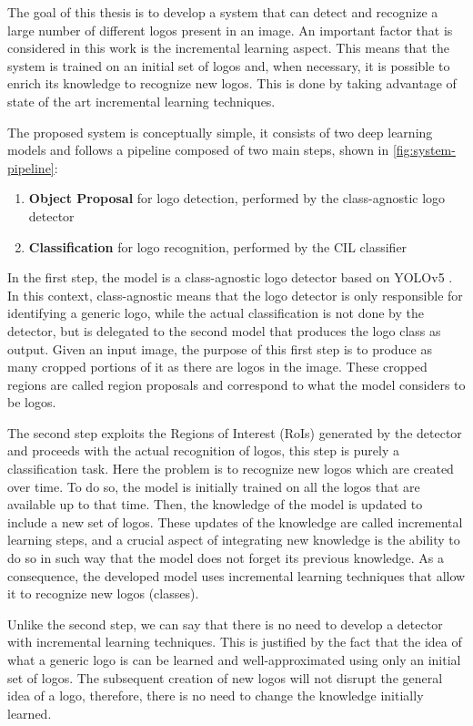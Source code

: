 The goal of this thesis is to develop a system that can detect and recognize 
a large number of different logos present in an image. An important factor that is considered in this work is the incremental learning aspect. This means that the system is trained on an initial set of logos and, when necessary, it is possible to enrich its knowledge to recognize new logos. This is done by taking advantage of state of the art incremental learning techniques.

The proposed system is conceptually simple, it consists of two deep learning models and follows a pipeline composed of two main steps, shown in \autoref{fig:system-pipeline}:

\begin{enumerate}
    \item \textbf{Object Proposal} for logo detection, performed by the class-agnostic logo detector
    \item \textbf{Classification} for logo recognition, performed by the CIL classifier
\end{enumerate}

In the first step, the model is a class-agnostic logo detector based on YOLOv5 \cite{glenn_jocher_2021_5563715}. In this context, class-agnostic means that the logo detector is only responsible for identifying a generic logo, while the actual classification is not done by the detector, but is delegated to the second model that produces the logo class as output.
Given an input image, the purpose of this first step is to produce as many cropped portions of it as there are logos in the image. These cropped regions are called region proposals and correspond to what the model considers to be logos.

The second step exploits the Regions of Interest (RoIs) generated by the detector and proceeds with the actual recognition of logos, this step is purely a classification task.
Here the problem is to recognize new logos which are created over time. To do so, the model is initially trained on all the logos that are available up to that time. Then, the knowledge of the model is updated to include a new set of logos. These updates of the knowledge are called incremental learning steps, and a crucial aspect of integrating new knowledge is the ability to do so in such way that the model does not forget its previous knowledge. As a consequence, the developed model uses incremental learning techniques that allow it to recognize new logos (classes).

Unlike the second step, we can say that there is no need to develop a detector with incremental learning techniques. This is justified by the fact that the idea of what a generic logo is can be learned and well-approximated using only an initial set of logos. The subsequent creation of new logos will not disrupt the general idea of a logo, therefore, there is no need to change the knowledge initially learned.

